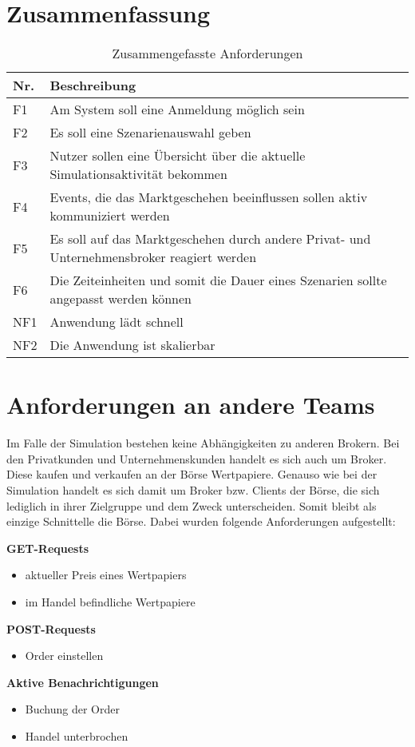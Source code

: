\section{Zusammenfassung}
	\begin{table}[ht!]
		\centering
		\begin{tabularx}{.8\textwidth}{l|X}
			Nr.     & Beschreibung                              \\\hline
			F1      & Am System soll eine Anmeldung möglich sein                  \\
			F2		& Es soll eine Szenarienauswahl geben \\
			F3      & Nutzer sollen eine Übersicht über die aktuelle Simulationsaktivität bekommen  \\
			F4      & Events, die das Marktgeschehen beeinflussen sollen aktiv kommuniziert werden  \\
			F5      & Es soll auf das Marktgeschehen durch andere Privat- und Unternehmensbroker reagiert werden  \\
			F6      & Die Zeiteinheiten und somit die Dauer eines Szenarien sollte angepasst werden können  \\\hline
			NF1     & Anwendung lädt schnell                    \\
			NF2     & Die Anwendung ist skalierbar                \\
		\end{tabularx}
		\caption{Zusammengefasste Anforderungen}
		\label{tab:anforderungen}
	\end{table}



\section{Anforderungen an andere Teams}\label{sec:otherTeams}
	Im Falle der Simulation bestehen keine Abhängigkeiten zu anderen Brokern. Bei den Privatkunden und Unternehmenskunden handelt es sich auch um Broker.
	Diese kaufen und verkaufen an der Börse Wertpapiere. Genauso wie bei der Simulation handelt es sich damit um Broker bzw. Clients der Börse, die sich lediglich in ihrer Zielgruppe und dem Zweck unterscheiden. Somit bleibt als einzige Schnittelle die Börse. Dabei wurden folgende Anforderungen aufgestellt:
	
	\textbf{GET-Requests}
		\begin{itemize}
			\item aktueller Preis eines Wertpapiers
			\item im Handel befindliche Wertpapiere
		\end{itemize}
	\textbf{POST-Requests}
		\begin{itemize}
			\item Order einstellen
		\end{itemize}
	\textbf{Aktive Benachrichtigungen}
		\begin{itemize}
			\item Buchung der Order
			\item Handel unterbrochen
		\end{itemize}
